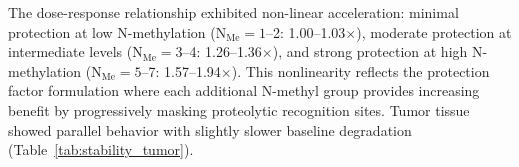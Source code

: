 \documentclass[10pt,letterpaper]{article}
\begin{document}
\begin{table}[H]
\centering
\caption{N-Methylation Protection in Normal Tissue}
\label{tab:stability_normal}
\end{table}

The dose-response relationship exhibited non-linear acceleration: minimal protection at low N-methylation (N$_{\text{Me}} = 1$--2: 1.00--1.03$\times$), moderate protection at intermediate levels (N$_{\text{Me}} = 3$--4: 1.26--1.36$\times$), and strong protection at high N-methylation (N$_{\text{Me}} = 5$--7: 1.57--1.94$\times$). This nonlinearity reflects the protection factor formulation where each additional N-methyl group provides increasing benefit by progressively masking proteolytic recognition sites. Tumor tissue showed parallel behavior with slightly slower baseline degradation (Table~\ref{tab:stability_tumor}).
\end{document}
